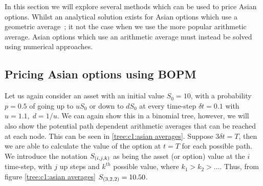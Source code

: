 In this section we will explore several methods which can be used to price Asian options. Whilst an analytical solution exists for Asian options which use a geometric average~\cite{zhang1997exotic}; it not the case when we use the more popular arithmetic average. Asian options which use an arithmetic average must instead be solved using numerical approaches.

\subsection{Pricing Asian options using BOPM}

Let us again consider an asset with an initial value \(S_0 = 10\), with a probability \(p = 0.5\) of going up to \(uS_0\) or down to \(dS_0\) at every time-step \(\delta t = 0.1\) with \(u=1.1,\;d=1/u\). We can again show this in a binomial tree, however, we will also show the potential path dependent arithmetic averages that can be reached at each node. This can be seen in \autoref{tree:c1:asian averages}.
\nline{}
Suppose \(3\delta t = T\), then we are able to calculate the value of the option at \(t=T\) for each possible path. We introduce the notation \(S_{\left(i,j,k\right)}\) as being the asset (or option) value at the \(i\) time-step, with \(j\) up steps and \(k^{th}\) possible value, where \(k_1 > k_2 > \dots \). Thus, from figure \autoref{tree:c1:asian averages} \(S_{\left(3,2,2\right)} = 10.50\).

